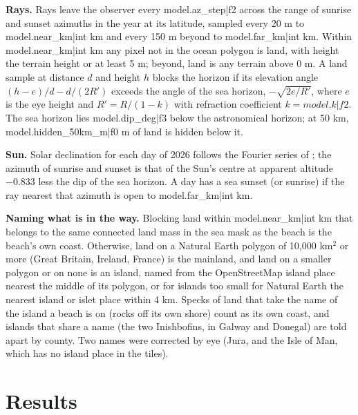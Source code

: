\documentclass[11pt,a4paper]{article}
\begin{document}
\textbf{Rays.} Rays leave the observer every {{model.az_step|f2}}\textdegree{} across the range of sunrise and sunset azimuths in the year at its latitude, sampled every 20 m to {{model.near_km|int}} km and every 150 m beyond to {{model.far_km|int}} km. Within {{model.near_km|int}} km any pixel not in the ocean polygon is land, with height the terrain height or at least 5 m; beyond, land is any terrain above 0 m. A land sample at distance $d$ and height $h$ blocks the horizon if its elevation angle $(h-e)/d - d/(2R')$ exceeds the angle of the sea horizon, $-\sqrt{2e/R'}$, where $e$ is the eye height and $R' = R/(1-k)$ with refraction coefficient $k={{model.k|f2}}$. The sea horizon lies {{model.dip_deg|f3}}\textdegree{} below the astronomical horizon; at 50 km, {{model.hidden_50km_m|f0}} m of land is hidden below it.

\textbf{Sun.} Solar declination for each day of 2026 follows the Fourier series of \citet{spencer1971}; the azimuth of sunrise and sunset is that of the Sun's centre at apparent altitude $-0.833$\textdegree{} less the dip of the sea horizon. A day has a sea sunset (or sunrise) if the ray nearest that azimuth is open to {{model.far_km|int}} km.

\textbf{Naming what is in the way.} Blocking land within {{model.near_km|int}} km that belongs to the same connected land mass in the sea mask as the beach is the beach's own coast. Otherwise, land on a Natural Earth polygon of 10,000 km$^2$ or more (Great Britain, Ireland, France) is the mainland, and land on a smaller polygon or on none is an island, named from the OpenStreetMap island place nearest the middle of its polygon, or for islands too small for Natural Earth the nearest island or islet place within 4 km. Specks of land that take the name of the island a beach is on (rocks off its own shore) count as its own coast, and islands that share a name (the two Inishbofins, in Galway and Donegal) are told apart by county. Two names were corrected by eye (Jura, and the Isle of Man, which has no island place in the tiles).

\section{Results}
\end{document}
